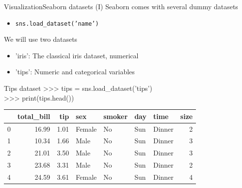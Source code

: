 \documentclass[10pt,compress]{beamer} %
\begin{document}
\begin{frame}[fragile]{Visualization}{Seaborn datasets (I)}
	Seaborn comes with several dummy datasets
	\begin{itemize}
		\item \texttt{sns.load\_dataset('name')}
	\end{itemize}
	We will use two datasets
	\begin{itemize}
		\item 'iris': The classical iris dataset, numerical
		\item 'tips': Numeric and categorical variables
	\end{itemize}

	\footnotesize{
	\begin{exampleblock}{\footnotesize{Tips dataset}}
	>>> tips = sns.load\_dataset('tips')\\
	>>> print(tips.head())\\
	\begin{tabular}{lrrllllr}
		\hline
		{} &  total\_bill &   tip &     sex & smoker &  day &    time &  size \\
		\hline
		0 &       16.99 &  1.01 &  Female &     No &  Sun &  Dinner &     2 \\
		1 &       10.34 &  1.66 &    Male &     No &  Sun &  Dinner &     3 \\
		2 &       21.01 &  3.50 &    Male &     No &  Sun &  Dinner &     3 \\
		3 &       23.68 &  3.31 &    Male &     No &  Sun &  Dinner &     2 \\
		4 &       24.59 &  3.61 &  Female &     No &  Sun &  Dinner &     4 \\
		\hline
	\end{tabular}
	\end{exampleblock}
	}
\end{frame}
\end{document}
